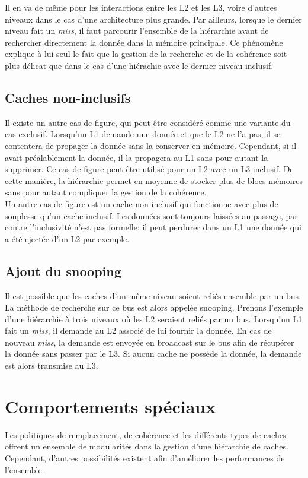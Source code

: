 Il en va de même pour les interactions entre les L2 et les L3, voire d'autres niveaux dans le cas d'une architecture plus grande. Par ailleurs, lorsque le dernier niveau fait un \textit{miss}, il faut parcourir l'ensemble de la hiérarchie avant de rechercher directement la donnée dans la mémoire principale. Ce phénomène explique à lui seul le fait que la gestion de la recherche et de la cohérence soit plus délicat que dans le cas d'une hiérachie avec le dernier niveau inclusif.

\subsection{Caches non-inclusifs}
Il existe un autre cas de figure, qui peut être considéré comme une variante du cas exclusif. Lorsqu'un L1 demande une donnée et que le L2 ne l'a pas, il se contentera de propager la donnée sans la conserver en mémoire. Cependant, si il avait préalablement la donnée, il la propagera au L1 sans pour autant la supprimer. Ce cas de figure peut être utilisé pour un L2 avec un L3 inclusif. De cette manière, la hiérarchie permet en moyenne de stocker plus de blocs mémoires sans pour autant compliquer la gestion de la cohérence. \\

Un autre cas de figure est un cache non-inclusif qui fonctionne avec plus de souplesse qu'un cache inclusif. Les données sont toujours laissées au passage, par contre l'inclusivité n'est pas formelle: il peut perdurer dans un L1 une donnée qui a été ejectée d'un L2 par exemple.

\subsection{Ajout du snooping}
\label{snooping}
 Il est possible que les caches d'un même niveau soient reliés ensemble par un bus. La méthode de recherche sur ce bus est alors appelée snooping. Prenons l'exemple d'une hiérarchie à trois niveaux où les L2 seraient reliés par un bus. Lorsqu'un L1 fait un \textit{miss}, il demande au L2 associé de lui fournir la donnée. En cas de nouveau \textit{miss}, la demande est envoyée en broadcast sur le bus afin de récupérer la donnée sans passer par le L3. Si aucun cache ne possède la donnée, la demande est alors transmise au L3.

\newpage
\section{Comportements spéciaux}
Les politiques de remplacement, de cohérence et les différents types de caches offrent un ensemble de modularités dans la gestion d'une hiérarchie de caches. Cependant, d'autres possibilités existent afin d'améliorer les performances de l'ensemble.

